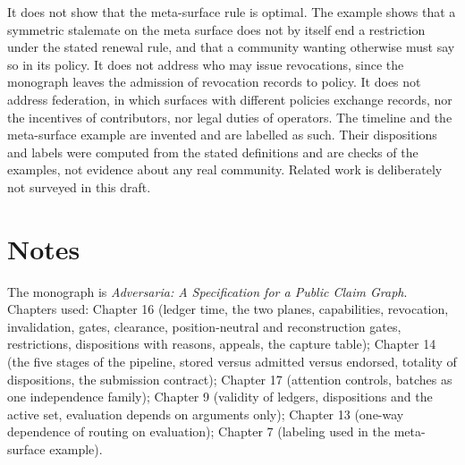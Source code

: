 \documentclass[11pt]{article}
\begin{document}
It does not show that the meta-surface rule is optimal. The example shows that a symmetric stalemate on the meta surface does not by itself end a restriction under the stated renewal rule, and that a community wanting otherwise must say so in its policy. It does not address who may issue revocations, since the monograph leaves the admission of revocation records to policy. It does not address federation, in which surfaces with different policies exchange records, nor the incentives of contributors, nor legal duties of operators. The timeline and the meta-surface example are invented and are labelled as such. Their dispositions and labels were computed from the stated definitions and are checks of the examples, not evidence about any real community. Related work is deliberately not surveyed in this draft.


\section*{Notes}

The monograph is \emph{Adversaria: A Specification for a Public Claim Graph}. Chapters used: Chapter 16 (ledger time, the two planes, capabilities, revocation, invalidation, gates, clearance, position-neutral and reconstruction gates, restrictions, dispositions with reasons, appeals, the capture table); Chapter 14 (the five stages of the pipeline, stored versus admitted versus endorsed, totality of dispositions, the submission contract); Chapter 17 (attention controls, batches as one independence family); Chapter 9 (validity of ledgers, dispositions and the active set, evaluation depends on arguments only); Chapter 13 (one-way dependence of routing on evaluation); Chapter 7 (labeling used in the meta-surface example).
\end{document}
